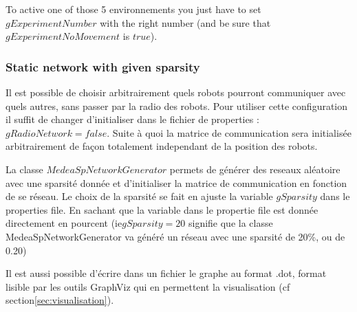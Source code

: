 \documentclass[a4paper,10pt]{report}
\begin{document}
To active one of those 5 environnements you just have to set $gExperimentNumber$ with the right number (and be sure that $gExperimentNoMovement$ is $true$). 
\subsubsection{Static network with given sparsity}
\label{sec:staticnet}
Il est possible de choisir arbitrairement quels robots pourront communiquer avec quels autres, sans passer par la radio des robots. Pour utiliser cette configuration il suffit de changer d'initialiser dans le fichier de properties : $gRadioNetwork = false$. Suite à quoi la matrice de communication sera initialisée arbitrairement de fa\c con totalement independant de la position des robots.

La classe $MedeaSpNetworkGenerator$ permets de générer des reseaux aléatoire avec une sparsité donnée et d'initialiser la matrice de communication en fonction de se réseau. Le choix de la sparsité se fait en ajuste la variable $gSparsity$ dans le properties file. En sachant que la variable dans le propertie file est donnée directement en pourcent (ie$gSparsity = 20$ signifie que la classe MedeaSpNetworkGenerator va généré un réseau avec une sparsité de 20\%, ou de 0.20)

Il est aussi possible d'écrire dans un fichier le graphe au format .dot, format lisible par les outils GraphViz qui en permettent la visualisation (cf section\ref{sec:visualisation}).
\end{document}
